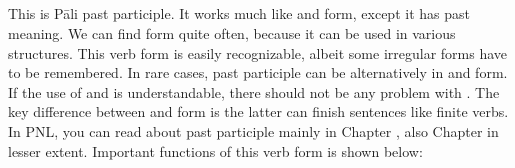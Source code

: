 {}
\subsection*{} 

This is P\=ali past participle. It works much like  and  form, except it has past meaning. We can find  form quite often, because it can be used in various structures. This verb form is easily recognizable, albeit some irregular forms have to be remembered. In rare cases, past participle can be alternatively in  and  form. If the use of  and  is understandable, there should not be any problem with . The key difference between  and  form is the latter can finish sentences like finite verbs. In PNL, you can read about past participle mainly in Chapter , also Chapter  in lesser extent. Important functions of this verb form is shown below:

